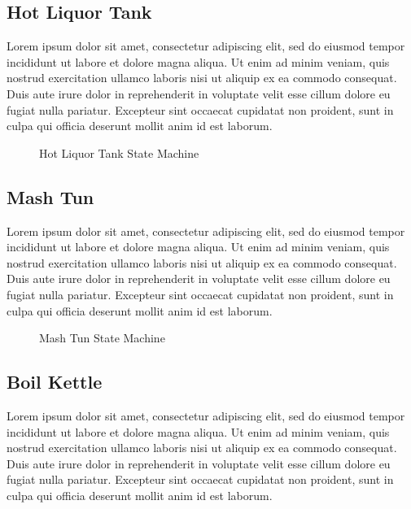 \documentclass[letterpaper, 10 pt, conference]{ieeeconf}  %
\begin{document}
\subsection{Hot Liquor Tank}

Lorem ipsum dolor sit amet, consectetur adipiscing elit, sed do eiusmod tempor incididunt ut labore et dolore magna aliqua. Ut enim ad minim veniam, quis nostrud exercitation ullamco laboris nisi ut aliquip ex ea commodo consequat. Duis aute irure dolor in reprehenderit in voluptate velit esse cillum dolore eu fugiat nulla pariatur. Excepteur sint occaecat cupidatat non proident, sunt in culpa qui officia deserunt mollit anim id est laborum.

\begin{figure}[!htb]
  \centering
  
  \caption{Hot Liquor Tank State Machine}
\end{figure}

\subsection{Mash Tun}

Lorem ipsum dolor sit amet, consectetur adipiscing elit, sed do eiusmod tempor incididunt ut labore et dolore magna aliqua. Ut enim ad minim veniam, quis nostrud exercitation ullamco laboris nisi ut aliquip ex ea commodo consequat. Duis aute irure dolor in reprehenderit in voluptate velit esse cillum dolore eu fugiat nulla pariatur. Excepteur sint occaecat cupidatat non proident, sunt in culpa qui officia deserunt mollit anim id est laborum.

\begin{figure}[!htb]
  \centering
  
  \caption{Mash Tun State Machine}
\end{figure}

\subsection{Boil Kettle}

Lorem ipsum dolor sit amet, consectetur adipiscing elit, sed do eiusmod tempor incididunt ut labore et dolore magna aliqua. Ut enim ad minim veniam, quis nostrud exercitation ullamco laboris nisi ut aliquip ex ea commodo consequat. Duis aute irure dolor in reprehenderit in voluptate velit esse cillum dolore eu fugiat nulla pariatur. Excepteur sint occaecat cupidatat non proident, sunt in culpa qui officia deserunt mollit anim id est laborum.
\end{document}
